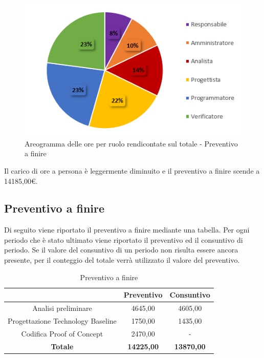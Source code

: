 \begin{figure}[H]
  \centering
  \includegraphics[scale=0.9]{immagini/ore_ruolo_preventivo_finire.png}
  \caption{Areogramma delle ore per ruolo rendicontate sul totale - Preventivo a finire}
\end{figure}

Il carico di ore a persona è leggermente diminuito e il preventivo a finire scende a 14185,00€.

\pagebreak

\subsection{Preventivo a finire} \label{subsection:preventivo_a_finire}
Di seguito viene riportato il preventivo a finire mediante una tabella.
Per ogni periodo che è stato ultimato viene riportato il preventivo ed il consuntivo di periodo.
Se il valore del consuntivo di un periodo non risulta essere ancora presente, per il conteggio del totale verrà utilizzato il valore del preventivo.
\begin{table}[H]
  \centering
  \renewcommand{\arraystretch}{1.8}
  \begin{tabular}{c|c|c}
    \rowcolor[HTML]{125E28}
    \multicolumn{1}{c}{\color[HTML]{FFFFFF}\textbf{Periodo}}
                                      & \multicolumn{1}{c}{\color[HTML]{FFFFFF}\textbf{Preventivo}}
                                      & \multicolumn{1}{c}{\color[HTML]{FFFFFF}\textbf{Consuntivo}}                     \\
    \hline
    Analisi preliminare               & 4645,00                                                     & 4605,00           \\
    Progettazione Technology Baseline & 1750,00                                                     & 1435,00           \\
    Codifica Proof of Concept         & 2470,00                                                     & -                 \\
    \textbf{Totale}                   & \textbf{14225,00}                                           & \textbf{13870,00} \\
  \end{tabular}
  \caption{Preventivo a finire}
\end{table}


